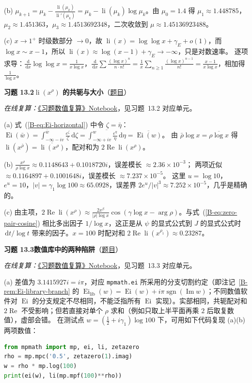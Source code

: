 \documentclass[11pt,a4paper]{article}
\DeclareMathOperator{\li}{li}
\DeclareMathOperator{\Ei}{Ei}
\newcommand{\dd}{\,\mathrm{d}}
\renewcommand{\Re}{\operatorname{Re}}
\renewcommand{\Im}{\operatorname{Im}}
\newcommand{\bref}[1]{\ref*{B-#1}}
\newcommand{\Sol}[2]{%
  \par\addvspace{1.2em}\noindent
  \hypertarget{s:#1}{}\textbf{习题 #1\quad #2}\hfill{\small（\hyperlink{q:#1}{题目}）}\par
  \nopagebreak\smallskip}
\begin{document}
(b) $\mu_{k+1}=\mu_k-\frac{\li(\mu_k)}{\li'(\mu_k)}=\mu_k-\li(\mu_k)\log\mu_k$。由 $\mu_0=1.4$ 得
$\mu_1\approx1.448785$，$\mu_2\approx1.451363$，$\mu_3\approx1.4513692348$，二次收敛到 $\mu\approx1.45136923488$。

(c) $x\to1^+$ 时级数部分 $\to0$，故 $\li(x)=\log\log x+\gamma_E+o(1)$，而 $\log x\sim x-1$，所以 $\li(x)\approx\log(x-1)+\gamma_E\to-\infty$，只是对数速率。
逐项求导：$\frac{\dd}{\dd x}\log\log x=\frac1{x\log x}$，$\frac{\dd}{\dd x}\sum\frac{(\log x)^n}{n\cdot n!}=\frac1x\sum_{n\ge1}\frac{(\log x)^{n-1}}{n!}=\frac{x-1}{x\log x}$，相加得 $\frac1{\log x}$。

\Sol{13.2}{$\li(x^\rho)$ 的共轭与大小}
\emph{在线复算：}\href{https://colab.research.google.com/github/lichengtong123/lichengtong-RH/blob/main/\%E4\%B9\%A0\%E9\%A2\%98\%E4\%B8\%8E\%E8\%A7\%A3\%E7\%AD\%94/\%E4\%B9\%A0\%E9\%A2\%98\%E6\%95\%B0\%E5\%80\%BC\%E5\%A4\%8D\%E7\%AE\%97.ipynb}{《习题数值复算》Notebook}，见习题~13.2 对应单元。

(a) 式~(\bref{eq:Ei-horizontal}) 中令 $\zeta=\bar\eta$：
$\Ei(\bar w)=\int_{-\infty-iv}^{\bar w}\frac{e^\zeta}\zeta\dd\zeta=\overline{\int_{-\infty+iv}^{w}\frac{e^\eta}\eta\dd\eta}=\overline{\Ei(w)}$。
由 $\bar\rho\log x=\overline{\rho\log x}$ 得 $\li(x^{\bar\rho})=\overline{\li(x^\rho)}$，配对和为 $2\Re\li(x^\rho)$。

(b) $\frac{x^\rho}{\rho\log x}\approx0.1148643+0.1018720i$，误差模长 $\approx2.36\times10^{-3}$；
两项近似 $\approx0.1164897+0.1001648i$，误差模长 $\approx7.237\times10^{-5}$。
这里 $u=\log10$，$e^u=10$，$|v|=\gamma_1\log100\approx65.0928$，误差界 $2e^u/|v|^3\approx7.252\times10^{-5}$，几乎是精确的。

(c) 由主项，$2\Re\li(x^\rho)\approx\frac{2x^\beta}{|\rho|\log x}\cos(\gamma\log x-\arg\rho)$。与式~(\bref{eq:zero-pair-cosine}) 相比多出因子 $1/\log x$，这正是从 $\psi$ 的显式公式到 $J$ 的显式公式时 $\dd t/\log t$ 带来的因子。$x=100$ 时配对和 $2\Re\li(x^{\rho_1})\approx0.23287$。

\Sol{13.3}{数值库中的两种陷阱}
\emph{在线复算：}\href{https://colab.research.google.com/github/lichengtong123/lichengtong-RH/blob/main/\%E4\%B9\%A0\%E9\%A2\%98\%E4\%B8\%8E\%E8\%A7\%A3\%E7\%AD\%94/\%E4\%B9\%A0\%E9\%A2\%98\%E6\%95\%B0\%E5\%80\%BC\%E5\%A4\%8D\%E7\%AE\%97.ipynb}{《习题数值复算》Notebook}，见习题~13.3 对应单元。

(a) 差值为 $3.1415927i=i\pi$，对应 \texttt{mpmath.ei} 所采用的分支切割约定（即注记~\bref{rem:Ei-library-branch} 的 $\Ei_{\mathrm{lib}}(w)=\Ei(w)+i\pi\operatorname{sgn}(\Im w)$；不同数值软件对 $\Ei$ 的分支规定不尽相同，不能泛指所有 $\Ei$ 实现）。实部相同，共轭配对和 $2\Re$ 不受影响；但若直接对单个 $\rho$ 求和（例如只取上半平面再乘 $2$ 后取复数值），虚部会错。
在测试点 $w=(\frac12+i\gamma_1)\log100$ 下，可用如下代码复现 (a)(b) 两项数值：
\begin{lstlisting}[language=Python]
from mpmath import mp, ei, li, zetazero
rho = mp.mpc('0.5', zetazero(1).imag)
w = rho * mp.log(100)
print(ei(w), li(mp.mpf(100)**rho))
\end{lstlisting}
\end{document}

